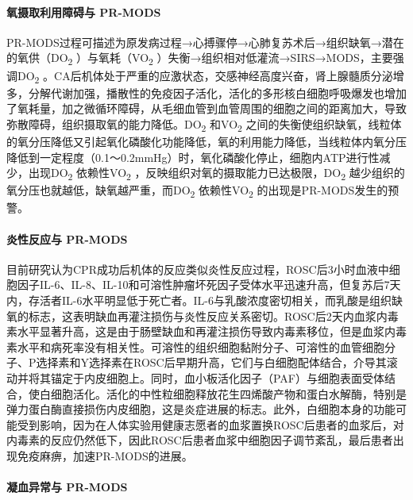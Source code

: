 \paragraph{氧摄取利用障碍与 PR-MODS}

PR-MODS过程可描述为原发病过程→心搏骤停→心肺复苏术后→组织缺氧→潜在的氧供（DO\textsubscript{2}
）与氧耗（VO\textsubscript{2}
）失衡→组织相对低灌流→SIRS→MODS，主要强调DO\textsubscript{2}
。CA后机体处于严重的应激状态，交感神经高度兴奋，肾上腺髓质分泌增多，分解代谢加强，播散性的免疫因子活化，活化的多形核白细胞呼吸爆发也增加了氧耗量，加之微循环障碍，从毛细血管到血管周围的细胞之间的距离加大，导致弥散障碍，组织摄取氧的能力降低。DO\textsubscript{2}
和VO\textsubscript{2}
之间的失衡使组织缺氧，线粒体的氧分压降低又引起氧化磷酸化功能降低，氧的利用能力降低，当线粒体内氧分压降低到一定程度（0.1～0.2mmHg）时，氧化磷酸化停止，细胞内ATP进行性减少，出现DO\textsubscript{2}
依赖性VO\textsubscript{2}
，反映组织对氧的摄取能力已达极限，DO\textsubscript{2}
越少组织的氧分压也就越低，缺氧越严重，而DO\textsubscript{2}
依赖性VO\textsubscript{2} 的出现是PR-MODS发生的预警。

\paragraph{炎性反应与 PR-MODS}

目前研究认为CPR成功后机体的反应类似炎性反应过程，ROSC后3小时血液中细胞因子IL-6、IL-8、IL-10和可溶性肿瘤坏死因子受体水平迅速升高，但复苏后7天内，存活者IL-6水平明显低于死亡者。IL-6与乳酸浓度密切相关，而乳酸是组织缺氧的标志，这表明缺血再灌注损伤与炎性反应关系密切。ROSC后2天内血浆内毒素水平显著升高，这是由于肠壁缺血和再灌注损伤导致内毒素移位，但是血浆内毒素水平和病死率没有相关性。可溶性的组织细胞黏附分子、可溶性的血管细胞分子、P选择素和Y选择素在ROSC后早期升高，它们与白细胞配体结合，介导其滚动并将其锚定于内皮细胞上。同时，血小板活化因子（PAF）与细胞表面受体结合，使白细胞活化。活化的中性粒细胞释放花生四烯酸产物和蛋白水解酶，特别是弹力蛋白酶直接损伤内皮细胞，这是炎症进展的标志。此外，白细胞本身的功能可能受到影响，因为在人体实验用健康志愿者的血浆置换ROSC后患者的血浆后，对内毒素的反应仍然低下，因此ROSC后患者血浆中细胞因子调节紊乱，最后患者出现免疫麻痹，加速PR-MODS的进展。

\paragraph{凝血异常与 PR-MODS}

